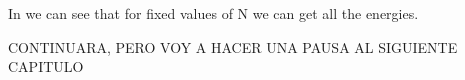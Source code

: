 In  we can see that for fixed values of N we can get all the energies.


CONTINUARA, PERO VOY A HACER UNA PAUSA AL SIGUIENTE CAPITULO








